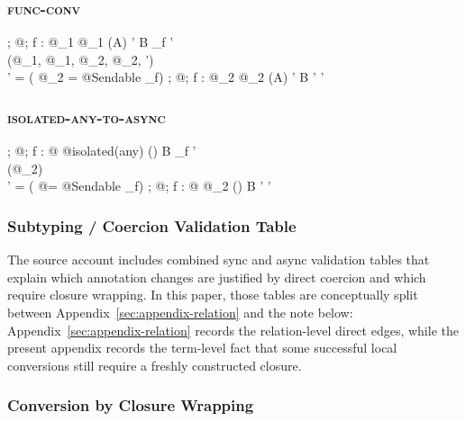 \subsubsection{\textsc{func-conv}}

  {\Gamma;\; @\kappa;\; \alpha \vdash f : @\sigma_1\; @\iota_1\; (A)\; \alpha' \to B \at \rho_f \dashv \Gamma' \\
   \isoCoercion(@\sigma_1, @\iota_1, @\sigma_2, @\iota_2, \alpha') \\
   \rho' = ( @\sigma_2 = @\textsf{Sendable}  \mathunderscore {} \rho_f)}
  {\Gamma;\; @\kappa;\; \alpha \vdash f : @\sigma_2\; @\iota_2\; (A)\; \alpha' \to B \at \rho' \dashv \Gamma'}

\subsubsection{\textsc{isolated-any-to-async}}

  {\Gamma;\; @\kappa;\; \alpha \vdash f : @\sigma\; @\textsf{isolated(any)}\; () \to B \at \rho_f \dashv \Gamma' \\
   \neg\isActorIsolated(@\iota_2) \\
   \rho' = ( @\sigma = @\textsf{Sendable}  \mathunderscore {} \rho_f)}
  {\Gamma;\; @\kappa;\; \alpha \vdash f : @\sigma\; @\iota_2\; ()\;  \to B \at \rho' \dashv \Gamma'}

\subsubsection{Subtyping / Coercion Validation Table}

The source account includes combined sync and async validation tables that explain which annotation changes are justified by direct coercion and which require closure wrapping. In this paper, those tables are conceptually split between Appendix~\ref{sec:appendix-relation} and the note below: Appendix~\ref{sec:appendix-relation} records the relation-level direct edges, while the present appendix records the term-level fact that some successful local conversions still require a freshly constructed closure.

\subsubsection{Conversion by Closure Wrapping}

